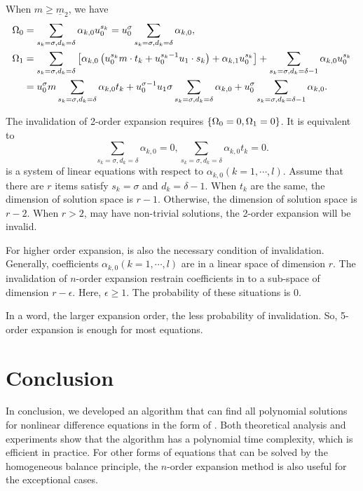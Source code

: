 When $m\ge\underline{m}_2$, we have
\begin{equation}
\begin{split}
\Omega_0&=\sum_{s_k=\sigma,d_k=\delta}{\alpha_{k,0}u_0^{s_k}}=u_0^\sigma\sum_{s_k=\sigma,d_k=\delta}{\alpha_{k,0}} , \\
\Omega_1&=\sum_{s_k=\sigma,d_k=\delta}\left[\alpha_{k,0}\left(u_0^{s_k}m\cdot {t_k}+u_0^{{s_k}-1}u_1\cdot {s_k}\right)+\alpha_{k,1}u_0^{s_k}\right]+\sum_{s_k=\sigma,d_k=\delta-1}{\alpha_{k,0}u_0^{s_k}} \\
&=u_0^\sigma m \sum_{s_k=\sigma,d_k=\delta}{\alpha_{k,0}t_k}+u_0^{\sigma-1}u_1\sigma\sum_{s_k=\sigma,d_k=\delta}{\alpha_{k,0}}+u_0^\sigma\sum_{s_k=\sigma,d_k=\delta-1}{\alpha_{k,0}} .
\end{split}
\end{equation}

The invalidation of 2-order expansion requires $\left\{\Omega_0=0,\Omega_1=0\right\}$. It is equivalent to
\begin{equation}
\sum_{s_k=\sigma,d_k=\delta}{\alpha_{k,0}}=0,\sum_{s_k=\sigma,d_k=\delta}{\alpha_{k,0}t_k}=0 .\label{invalid}
\end{equation}
 is a system of linear equations with respect to $\alpha_{k,0} (k=1,\cdots,l)$. Assume that there are $r$ items satisfy $s_k=\sigma$ and $d_k=\delta-1$. When $t_k$ are the same, the dimension of solution space is $r-1$. Otherwise, the dimension of solution space is $r-2$. When $r>2$,  may have non-trivial solutions, the 2-order expansion will be invalid.

For higher order expansion,  is also the necessary condition of invalidation. Generally, coefficients $\alpha_{k,0} (k=1,\cdots,l)$ are in a linear space of dimension $r$. The invalidation of $n$-order expansion restrain coefficients in to a sub-space of dimension $r-\epsilon$. Here, $\epsilon\ge 1$. The probability of these situations is 0.

In a word, the larger expansion order, the less probability of invalidation. So, 5-order expansion is enough for most equations.

\section{Conclusion} \label{Conclusion-02}

In conclusion, we developed an algorithm that can find all polynomial solutions for nonlinear difference equations in the form of . Both theoretical analysis and experiments show that the algorithm has a polynomial time complexity, which is efficient in practice. For other forms of equations that can be solved by the homogeneous balance principle, the $n$-order expansion method is also useful for the  exceptional cases.
